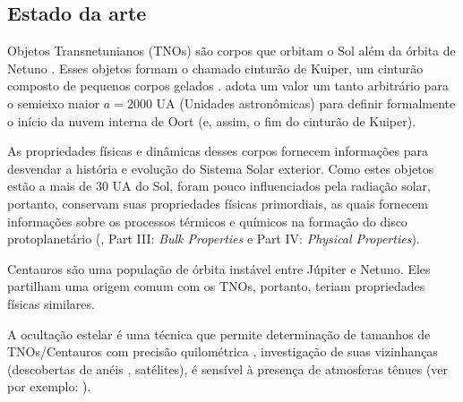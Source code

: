 \documentclass[a4paper, 11pt]{article}
\begin{document}
\subsection{Estado da arte}

Objetos Transnetunianos (TNOs) s\~ao corpos que orbitam o Sol al\'em da \'orbita de Netuno \citep{Jewitt:book}. Esses objetos formam o chamado cintur\~ao de Kuiper, um cintur\~ao composto de pequenos corpos gelados \citep{2016ApJ...825L..13S}. \citet{2008ssbn.book...43G} adota um valor um tanto arbitr\'ario para o semieixo maior $a = 2 000$ UA (Unidades astron\^omicas) para definir formalmente o in\'icio da nuvem interna de Oort (e, assim, o fim do cintur\~ao de Kuiper). 

As propriedades físicas e din\^amicas desses corpos fornecem informa\c{c}\~oes para desvendar a hist\'oria e evolução do Sistema Solar exterior. Como estes objetos est\~ao a mais de 30 UA do Sol, foram pouco influenciados pela radia\c{c}\~ao solar, portanto, conservam suas propriedades f\'isicas primordiais, as quais fornecem informa\c{c}\~oes sobre os processos t\'ermicos e qu\'imicos na forma\c{c}\~ao do disco protoplanet\'ario (\cite{Barucci}, Part III: \textit{Bulk Properties} e Part IV: \textit{Physical Properties}).

Centauros s\~ao uma popula\c{c}\~ao de \'orbita inst\'avel entre J\'upiter e Netuno. Eles partilham uma origem comum com os TNOs, portanto, teriam propriedades f\'isicas similares.

A oculta\c{c}\~ao estelar \'e uma t\'ecnica que permite determina\c{c}\~ao de tamanhos de TNOs/Centauros com precis\~ao quilom\'etrica \citep{2011Natur.478..493S, 2011epsc.conf.1060B, 2010DPS....42.2302E, 2011epsc.conf..704O}, investiga\c{c}\~ao de suas vizinhan\c{c}as (descobertas de an\'eis \citep{2014AGUFM.P43F..01B}, sat\'elites), \'e sens\'ivel \`a presen\c{c}a de atmosferas t\^enues (ver por exemplo: \citet{2015DPS....4720009D}).
\end{document}
